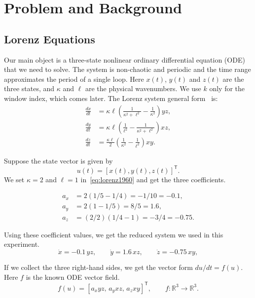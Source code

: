 \documentclass[conference,a4paper]{IEEEtran}
\begin{document}
\section{Problem and Background}


\subsection{Lorenz Equations}
Our main object is a three-state nonlinear ordinary differential equation (ODE) that we need to solve. The system is non-chaotic and periodic and the time range approximates the period of a single loop.  Here $x(t)$, $y(t)$ and $z(t)$ are the three states, and $\kappa$ and $\ell$ are the physical wavenumbers. We use $k$ only for the window index, which comes later. The Lorenz system general form~\cite{lorenz1960} is:
\begin{equation}
\begin{aligned}
\frac{dx}{dt}
  &= \kappa\ell
     \left(\frac{1}{\kappa^2+\ell^2}
           -\frac{1}{\kappa^2}\right)yz,\\
\frac{dy}{dt}
  &= \kappa\ell
     \left(\frac{1}{\ell^2}
           -\frac{1}{\kappa^2+\ell^2}\right)xz,\\
\frac{dz}{dt}
  &= \frac{\kappa\ell}{2}
     \left(\frac{1}{\kappa^2}
           -\frac{1}{\ell^2}\right)xy.
\end{aligned}
\label{eq:lorenz1960}
\end{equation}

Suppose the state vector is given by
\[
u(t)=[x(t),y(t),z(t)]^\mathsf{T}.
\]
 We set $\kappa=2$ and $\ell=1$ in~\eqref{eq:lorenz1960} and get the three coefficients.


\[
\begin{aligned}
a_x&=2(1/5-1/4)=-1/10=-0.1,\\
a_y&=2(1-1/5)=8/5=1.6,\\
a_z&=(2/2)(1/4-1)=-3/4=-0.75.
\end{aligned}
\]

Using these coefficient values, we get the reduced system we used in this experiment.
\begin{equation}
\dot{x}=-0.1\,yz,\qquad \dot{y}=1.6\,xz,\qquad \dot{z}=-0.75\,xy,
\label{eq:ode}
\end{equation}

If we collect the three right-hand sides, we get the vector form $du/dt=f(u)$. Here $f$ is the known ODE vector field.
\[
f(u)=[a_x yz,\,a_y xz,\,a_z xy]^\mathsf{T},\qquad f:\mathbb{R}^{3}\to\mathbb{R}^{3}.
\]
\end{document}
